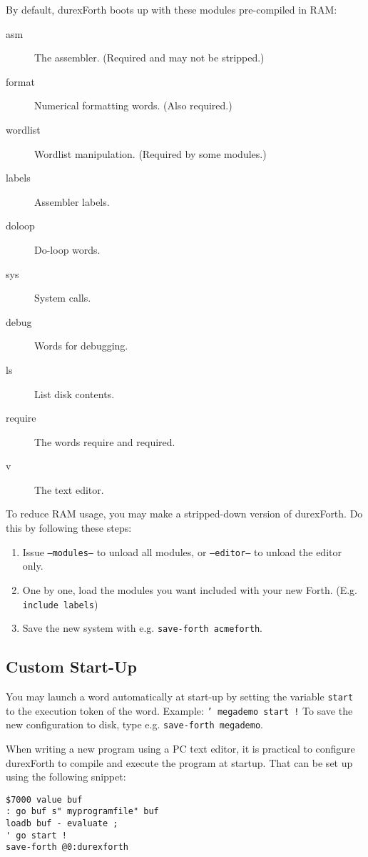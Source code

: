 By default, durexForth boots up with these modules pre-compiled in RAM:

\begin{description}
    \item[asm] The assembler. (Required and may not be stripped.)
    \item[format] Numerical formatting words. (Also required.)
    \item[wordlist] Wordlist manipulation. (Required by some modules.)
    \item[labels] Assembler labels.
    \item[doloop] Do-loop words.
    \item[sys] System calls.
    \item[debug] Words for debugging.
    \item[ls] List disk contents.
    \item[require] The words require and required.
    \item[v] The text editor.
\end{description}

To reduce RAM usage, you may make a stripped-down version of durexForth. Do this by following these steps:

\begin{enumerate}
\item Issue \texttt{---modules---} to unload all modules, or \texttt{---editor---} to unload the editor only.
\item One by one, load the modules you want included with your new Forth. (E.g. \texttt{include labels})
\item Save the new system with e.g. \texttt{save-forth acmeforth}.
\end{enumerate}

\subsection{Custom Start-Up}

You may launch a word automatically at start-up by setting the variable \texttt{start} to the execution token of the word.  Example: \texttt{' megademo start !} To save the new configuration to disk, type e.g. \texttt{save-forth megademo}.

When writing a new program using a PC text editor, it is practical to configure durexForth to compile and execute the program at startup. That can be set up using the following snippet:

\begin{verbatim}
$7000 value buf
: go buf s" myprogramfile" buf
loadb buf - evaluate ;
' go start !
save-forth @0:durexforth
\end{verbatim}

